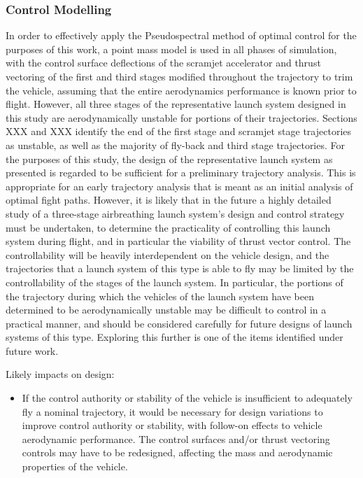 \subsubsection{Control Modelling}
In order to effectively apply the Pseudospectral method of optimal control for the purposes of this work, a point mass model is used in all phases of simulation, with the control surface deflections of the scramjet accelerator and thrust vectoring of the first and third stages modified throughout the trajectory to trim the vehicle, assuming that the entire aerodynamics performance is known prior to flight. However, all three stages of the representative launch system designed in this study are aerodynamically unstable for portions of their trajectories. Sections XXX and XXX identify the end of the first stage and scramjet stage trajectories as unstable, as well as the majority of fly-back and third stage trajectories.
For the purposes of this study, the design of the representative launch system as presented is regarded to be sufficient for a preliminary trajectory analysis. This is appropriate for an early trajectory analysis that is meant as an initial analysis of optimal fight paths. 
However, it is likely that in the future a highly detailed study of a three-stage airbreathing launch system's design and control strategy must be undertaken, to determine the practicality of controlling this launch system during flight, and in particular the viability of thrust vector control. The controllability will be heavily interdependent on the vehicle design, and the trajectories that a launch system of this type is able to fly may be limited by the controllability of the stages of the launch system. In particular, the portions of the trajectory during which the vehicles of the launch system have been determined to be aerodynamically unstable may be difficult to control in a practical manner, and should be considered carefully for future designs of launch systems of this type. 
Exploring this further is one of the items identified under future work.

Likely impacts on design:
\begin{itemize}[noitemsep,topsep=0pt]
	\item If the control authority or stability of the vehicle is insufficient to adequately fly a nominal trajectory, it would be necessary for design variations to improve control authority or stability, with follow-on effects to vehicle aerodynamic performance. The control surfaces and/or thrust vectoring controls may have to be redesigned, affecting the mass and aerodynamic properties of the vehicle. 
\end{itemize}
	

